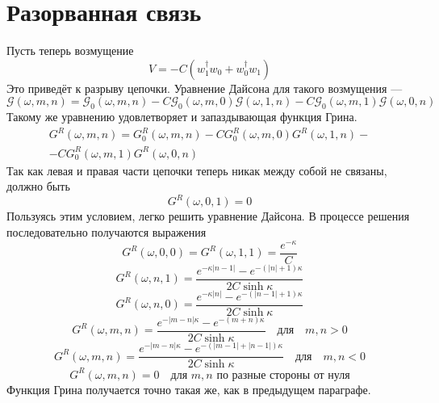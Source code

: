 \documentclass{article}
\begin{document}
\section{Разорванная связь}
Пусть теперь возмущение
\begin{equation}
	V = -C(w_1^\dagger w_0 + w_0^\dagger w_1)
\end{equation}
Это приведёт к разрыву цепочки. Уравнение Дайсона для такого возмущения ---
\begin{equation}
	\mathcal{G}(\omega, m,n) = \mathcal{G}_0(\omega, m,n) - 
			C\mathcal{G}_0(\omega, m, 0) \mathcal{G}(\omega, 1, n) -
			C\mathcal{G}_0(\omega, m, 1) \mathcal{G}(\omega, 0, n)
\end{equation}
Такому же уравнению удовлетворяет и запаздывающая функция Грина. 
\begin{multline}
	G^R(\omega, m,n) = G^R_0(\omega, m,n) - 
			CG^R_0(\omega, m, 0) G^R(\omega, 1, n) - \\
			-CG^R_0(\omega, m, 1) G^R(\omega, 0, n)
\end{multline}
Так как левая и правая части цепочки теперь никак между собой не связаны, должно быть
\begin{equation}
	\label{condition}
	G^R(\omega, 0, 1) = 0
\end{equation}
Пользуясь этим условием, легко решить уравнение Дайсона. В процессе решения последовательно
получаются выражения
\begin{equation}
	G^R(\omega,0,0) =G^R(\omega,1,1) = \frac{e^{-\kappa}}{C}
\end{equation}
\begin{equation}
	G^R(\omega, n,1) = \frac{e^{-\kappa|n-1|} - e^{-(|n|+1)\kappa}}{2C\sinh\kappa}
\end{equation}
\begin{equation}
	G^R(\omega, n,0) = \frac{e^{-\kappa|n|} - e^{-(|n-1|+1)\kappa}}{2C\sinh\kappa}
\end{equation}
\begin{equation}
		G^R(\omega,m,n)= \frac{e^{-|m-n|\kappa} - e^{-(m+n)\kappa}}{2C\sinh \kappa}
			\quad \mbox{для} \quad m,n > 0
\end{equation}
\begin{equation}
		G^R(\omega,m,n)= \frac{e^{-|m-n|\kappa} - e^{-(|m-1|+|n-1|)\kappa}}{2C\sinh \kappa}
			\quad \mbox{для} \quad m,n < 0
\end{equation}
\begin{equation}
		G^R(\omega,m,n)= 0
			\quad \mbox{для } m,n \mbox{ по разные стороны от нуля}
\end{equation}
Функция Грина получается точно такая же, как в предыдущем параграфе. 
\end{document}
